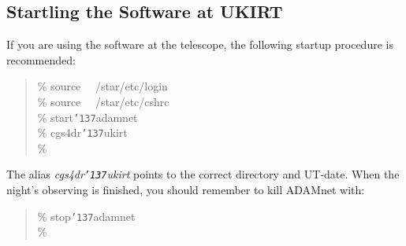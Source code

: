 \documentclass[a4paper]{book}
\renewcommand{\_}{{\tt\char'137}}
\begin{document}
\subsection{Startling the Software at UKIRT}
If you are using the software at the telescope, the following startup procedure is
recommended:

\begin{minipage}{120mm}
\begin{quote}
  \%  source \ \ /star/etc/login \\
  \%  source \ \ /star/etc/cshrc \\
  \%  start\_adamnet \\
  \%  cgs4dr\_ukirt \\
  \%
\end{quote}
\end{minipage}

The alias {\it cgs4dr\_ukirt} points to the correct directory and UT-date.
When the night's observing is finished, you should remember to kill ADAMnet with:

\begin{minipage}{120mm}
\begin{quote}
  \%  stop\_adamnet \\
  \%
\end{quote}
\end{minipage}
\end{document}
